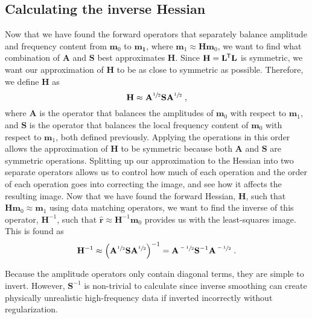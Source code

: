 \subsection{Calculating the inverse Hessian}
    Now that we have found the forward operators that separately balance amplitude and frequency content from $\mathbf{m}_0$ to $\mathbf{m_1}$, where $\mathbf{m}_1 \approx \mathbf{H} \mathbf{m}_0$, we want to find what combination of $\mathbf{A}$ and $\mathbf{S}$ best approximates $\mathbf{H}$.
    Since $\mathbf{H} = \mathbf{L}^{\mkern-1.5mu\mathsf{T}}\mathbf{L}$ is symmetric, we want our approximation of $\mathbf{H}$ to be as close to symmetric as possible.
    Therefore, we define $\mathbf{H}$ as
    \begin{equation}
        \mathbf{H} \approx \mathbf{A}^{\sfrac{1}{2}}\mathbf{S}\mathbf{A}^{\sfrac{1}{2}} \;,
    \end{equation}
    where $\mathbf{A}$ is the operator that balances the amplitudes of $\mathbf{m}_0$ with respect to $\mathbf{m}_1$, and $\mathbf{S}$ is the operator that balances the local frequency content of $\mathbf{m}_0$ with respect to $\mathbf{m}_1$, both defined previously.
    Applying the operations in this order allows the approximation of $\mathbf{H}$ to be symmetric because both $\mathbf{A}$ and $\mathbf{S}$ are symmetric operations. 
    Splitting up our approximation to the Hessian into two separate operators allows us to control how much of each operation and the order of each operation goes into correcting the image, and see how it affects the resulting image.
    Now that we have found the forward Hessian, $\mathbf{H}$, such that $\mathbf{H}\mathbf{m}_0 \approx \mathbf{m}_1$ using data matching operators, we want to find the inverse of this operator, $\mathbf{H}^{-1}$, such that $\hat{\mathbf{r}} \approx \mathbf{H} ^{-1} \mathbf{m}_0$ provides us with the least-squares image.
    This is found as
    \begin{equation}
        \mathbf{H}^{-1} \approx \left ( \mathbf{A}^{\sfrac{1}{2}} \mathbf{S} \mathbf{A}^{\sfrac{1}{2}} \right )^{-1} = 
        \mathbf{A}^{\sfrac{-1}{2}} \mathbf{S}^{-1} \mathbf{A}^{\sfrac{-1}{2}}\;.
        \label{eq:invh}
    \end{equation}

    Because the amplitude operators only contain diagonal terms, they are simple to invert. 
    However, $\mathbf{S}^{-1}$ is non-trivial to calculate since inverse smoothing can create physically unrealistic high-frequency data if inverted incorrectly without regularization.

